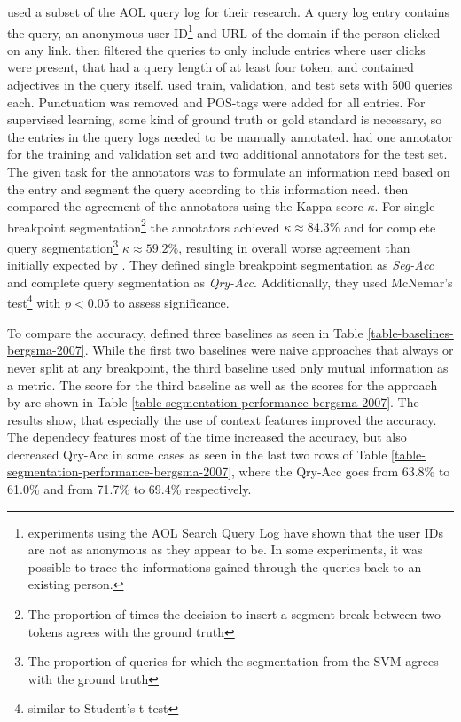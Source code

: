 



\citeauthor{Bergsma:2007} used a subset of the AOL query log \cite{Pass:2006} for their research. A query log entry contains the query, an anonymous user ID\footnote{experiments using the AOL Search Query Log have shown that the user IDs are not as anonymous as they appear to be. In some experiments, it was possible to trace the informations gained through the queries back to an existing person.} and URL of the domain if the person clicked on any link.
\citeauthor{Bergsma:2007} then filtered the queries to only include entries where user clicks were present, that had a query length of at least four token, and contained adjectives in the query itself.
\citeauthor{Bergsma:2007} used train, validation, and test sets with 500 queries each. Punctuation was removed and POS-tags were added for all entries. For supervised learning, some kind of ground truth or gold standard is necessary, so the entries in the query logs needed to be manually annotated. \citeauthor{Bergsma:2007} had one annotator for the training and validation set and two additional annotators for the test set. The given task for the annotators was to formulate an information need based on the entry and segment the query according to this information need. \citeauthor{Bergsma:2007} then compared the agreement of the annotators using the Kappa score $\kappa$. For single breakpoint segmentation\footnote{The proportion of times the decision to insert a segment break between two tokens agrees with the ground truth} the annotators achieved $\kappa \approx 84.3\%$ and for complete query segmentation\footnote{The proportion of queries for which the segmentation from the SVM agrees with the ground truth} $\kappa \approx 59.2\%$, resulting in overall worse agreement than initially expected by \citeauthor{Bergsma:2007}.
They defined single breakpoint segmentation as \textit{Seg-Acc} and complete query segmentation as \textit{Qry-Acc}. Additionally, they used McNemar's test\footnote{similar to Student's t-test} with $p<0.05$ to assess significance.

To compare the accuracy, \citeauthor{Bergsma:2007} defined three baselines as seen in Table \ref{table-baselines-bergsma-2007}.
While the first two baselines were naive approaches that always or never split at any breakpoint, the third baseline used only mutual information as a metric. The score for the third baseline as well as the scores for the approach by \citeauthor{Bergsma:2007} are shown in Table \ref{table-segmentation-performance-bergsma-2007}. The results show, that especially the use of context features improved the accuracy. The dependecy features most of the time increased the accuracy, but also decreased Qry-Acc in some cases as seen in the last two rows of Table \ref{table-segmentation-performance-bergsma-2007}, where the Qry-Acc goes from 63.8\% to 61.0\% and from 71.7\% to 69.4\% respectively.